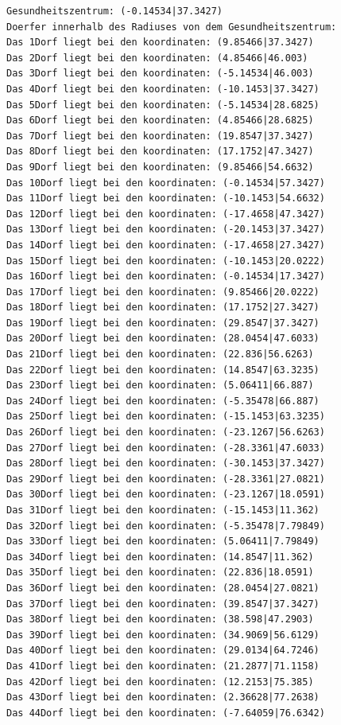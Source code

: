 \documentclass{article}
\begin{document}
\begin{verbatim}
Gesundheitszentrum: (-0.14534|37.3427)
Doerfer innerhalb des Radiuses von dem Gesundheitszentrum: 
Das 1Dorf liegt bei den koordinaten: (9.85466|37.3427)
Das 2Dorf liegt bei den koordinaten: (4.85466|46.003)
Das 3Dorf liegt bei den koordinaten: (-5.14534|46.003)
Das 4Dorf liegt bei den koordinaten: (-10.1453|37.3427)
Das 5Dorf liegt bei den koordinaten: (-5.14534|28.6825)
Das 6Dorf liegt bei den koordinaten: (4.85466|28.6825)
Das 7Dorf liegt bei den koordinaten: (19.8547|37.3427)
Das 8Dorf liegt bei den koordinaten: (17.1752|47.3427)
Das 9Dorf liegt bei den koordinaten: (9.85466|54.6632)
Das 10Dorf liegt bei den koordinaten: (-0.14534|57.3427)
Das 11Dorf liegt bei den koordinaten: (-10.1453|54.6632)
Das 12Dorf liegt bei den koordinaten: (-17.4658|47.3427)
Das 13Dorf liegt bei den koordinaten: (-20.1453|37.3427)
Das 14Dorf liegt bei den koordinaten: (-17.4658|27.3427)
Das 15Dorf liegt bei den koordinaten: (-10.1453|20.0222)
Das 16Dorf liegt bei den koordinaten: (-0.14534|17.3427)
Das 17Dorf liegt bei den koordinaten: (9.85466|20.0222)
Das 18Dorf liegt bei den koordinaten: (17.1752|27.3427)
Das 19Dorf liegt bei den koordinaten: (29.8547|37.3427)
Das 20Dorf liegt bei den koordinaten: (28.0454|47.6033)
Das 21Dorf liegt bei den koordinaten: (22.836|56.6263)
Das 22Dorf liegt bei den koordinaten: (14.8547|63.3235)
Das 23Dorf liegt bei den koordinaten: (5.06411|66.887)
Das 24Dorf liegt bei den koordinaten: (-5.35478|66.887)
Das 25Dorf liegt bei den koordinaten: (-15.1453|63.3235)
Das 26Dorf liegt bei den koordinaten: (-23.1267|56.6263)
Das 27Dorf liegt bei den koordinaten: (-28.3361|47.6033)
Das 28Dorf liegt bei den koordinaten: (-30.1453|37.3427)
Das 29Dorf liegt bei den koordinaten: (-28.3361|27.0821)
Das 30Dorf liegt bei den koordinaten: (-23.1267|18.0591)
Das 31Dorf liegt bei den koordinaten: (-15.1453|11.362)
Das 32Dorf liegt bei den koordinaten: (-5.35478|7.79849)
Das 33Dorf liegt bei den koordinaten: (5.06411|7.79849)
Das 34Dorf liegt bei den koordinaten: (14.8547|11.362)
Das 35Dorf liegt bei den koordinaten: (22.836|18.0591)
Das 36Dorf liegt bei den koordinaten: (28.0454|27.0821)
Das 37Dorf liegt bei den koordinaten: (39.8547|37.3427)
Das 38Dorf liegt bei den koordinaten: (38.598|47.2903)
Das 39Dorf liegt bei den koordinaten: (34.9069|56.6129)
Das 40Dorf liegt bei den koordinaten: (29.0134|64.7246)
Das 41Dorf liegt bei den koordinaten: (21.2877|71.1158)
Das 42Dorf liegt bei den koordinaten: (12.2153|75.385)
Das 43Dorf liegt bei den koordinaten: (2.36628|77.2638)
Das 44Dorf liegt bei den koordinaten: (-7.64059|76.6342)

\end{verbatim}
\end{document}
